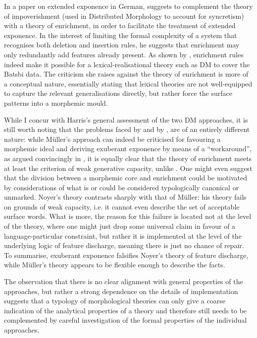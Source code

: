 \documentclass[output=paper]{langsci/langscibook}
\begin{document}
In a paper on extended exponence in German, \citet{MuellerGereon07} suggests
to complement the theory of impoverishment (used in Distributed Morphology
\citealp{Halle93} to account for syncretism) with a
theory of enrichment, in order to facilitate the treatment of extended
exponence. In the interest of limiting the formal complexity of a system that
recognises both deletion and insertion rules, he suggests that
enrichment may only redundantly add features already present. As shown by
\citet{Harris09}, enrichment rules indeed make it possible for a
lexical-realisational theory such as DM to cover the Batsbi
data.  The criticism she raises against the theory of enrichment is
more of a conceptual nature, essentially stating that lexical theories
are not well-equipped to capture the relevant generalisations directly,
but rather force the surface patterns into a
morphemic mould. 

While I concur with Harris's general assessment of the two DM
approaches, it is still worth noting that the problems faced by
\citet{Noyer92} and by \citet{MuellerGereon07}, are of an
entirely different nature: while  Müller's approach can indeed be
criticised for favouring a morphemic ideal and deriving exuberant
exponence by means of a ``workaround'', as argued convincingly in
\citet{Harris09}, it is equally clear that the theory of enrichment
meets at least the criterion of weak generative capacity, unlike
\citet{Noyer92}. One might even suggest that the division between a
morphemic core and enrichment could be motivated by considerations of
what is or could be considered typologically canonical or
unmarked. Noyer's theory contrasts sharply with that of Müller: 
his theory fails on grounds of weak capacity, i.e. it cannot even
describe the set of acceptable surface words. What is more, the reason for this
failure is located not at the level of the theory, where one might
just drop some universal claim in favour of a language-particular
constraint, but rather it is implemented at the level of the
underlying logic of feature discharge, meaning there is just no chance
of repair. To summarise, exuberant exponence falsifies Noyer's theory
of feature discharge, while Müller's theory appears to be flexible
enough to describe the facts.

The observation that there is no clear alignment with general
properties of the approaches, but rather a strong dependence on the
details of implementation suggests that a typology of morphological
theories can only give a coarse indication of the analytical
properties of a theory and therefore still needs to be complemented by
careful investigation of the formal properties of the individual
approaches.
      
\end{document}
